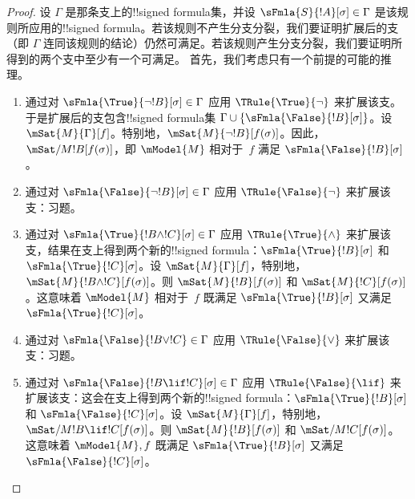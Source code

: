 \documentclass[../../../include/open-logic-section]{subfiles}
\begin{document}
\begin{proof}
设 $\Gamma$ 是那条支上的!!{signed formula}集，并设 $\sFmla{S}{!A}[\sigma] \in \Gamma$ 是该规则所应用的!!{signed formula}。若该规则不产生分支分裂，我们要证明扩展后的支（即 $\Gamma$ 连同该规则的结论）仍然可满足。若该规则产生分支分裂，我们要证明所得到的两个支中至少有一个可满足。
首先，我们考虑只有一个前提的可能的推理。
\begin{enumerate}
\item 通过对 $\sFmla{\True}{\lnot !B}[\sigma] \in \Gamma$ 应用 $\TRule{\True}{\lnot}$ 来扩展该支。于是扩展后的支包含!!{signed formula}集 $\Gamma \cup \{\sFmla{\False}{!B}[\sigma]\}$。设 $\mSat{M}{\Gamma}[f]$。特别地，$\mSat{M}{\lnot !B}[f(\sigma)]$。因此，$\mSat/{M}{!B}[f(\sigma)]$，即 $\mModel{M}$ 相对于~$f$ 满足 $\sFmla{\False}{!B}[\sigma]$。
\item 通过对 $\sFmla{\False}{\lnot !B}[\sigma] \in \Gamma$ 应用 $\TRule{\False}{\lnot}$ 来扩展该支：习题。
\item 通过对 $\sFmla{\True}{!B \land !C}[\sigma] \in \Gamma$ 应用 $\TRule{\True}{\land}$ 来扩展该支，结果在支上得到两个新的!!{signed formula}：$\sFmla{\True}{!B}[\sigma]$ 和 $\sFmla{\True}{!C}[\sigma]$。设 $\mSat{M}{\Gamma}[f]$，特别地，$\mSat{M}{!B \land !C}[f(\sigma)]$。则 $\mSat{M}{!B}[f(\sigma)]$ 和 $\mSat{M}{!C}[f(\sigma)]$。这意味着 $\mModel{M}$ 相对于~$f$ 既满足 $\sFmla{\True}{!B}[\sigma]$ 又满足 $\sFmla{\True}{!C}[\sigma]$。
\item 通过对 $\sFmla{\False}{!B \lor !C} \in \Gamma$ 应用 $\TRule{\False}{\lor}$ 来扩展该支：习题。
\item 通过对 $\sFmla{\False}{!B \lif !C}[\sigma] \in \Gamma$ 应用 $\TRule{\False}{\lif}$ 来扩展该支：这会在支上得到两个新的!!{signed formula}：$\sFmla{\True}{!B}[\sigma]$ 和 $\sFmla{\False}{!C}[\sigma]$。设 $\mSat{M}{\Gamma}[f]$，特别地，$\mSat/{M}{!B \lif !C}[f(\sigma)]$。则 $\mSat{M}{!B}[f(\sigma)]$ 和 $\mSat/{M}{!C}[f(\sigma)]$。这意味着 $\mModel{M}, f$ 既满足 $\sFmla{\True}{!B}[\sigma]$ 又满足 $\sFmla{\False}{!C}[\sigma]$。

\end{enumerate}
\end{proof}
\end{document}
